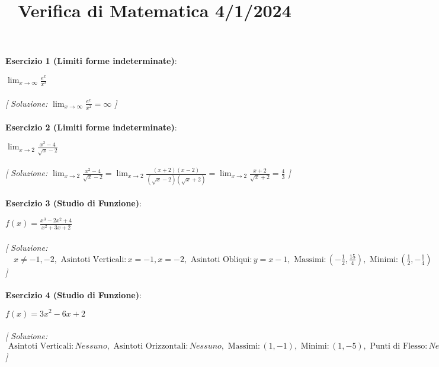 \documentclass{article}
\title{\raggedright Verifica di Matematica  4/1/2024}
\date{}
\begin{document}
\maketitle

\textbf{Esercizio 1 (Limiti forme indeterminate)}:\\
\par $\lim_{{x \to \infty}} \frac{e^x}{x^2}$ \\\\

\textit{[ Soluzione: $\lim_{{x \to \infty}} \frac{e^x}{x^2} = \infty$ ]}\\\\

\textbf{Esercizio 2 (Limiti forme indeterminate)}:\\
\par $\lim_{{x \to 2}} \frac{x^2 - 4}{\sqrt{x} - 2}$ \\\\

\textit{[ Soluzione: $\lim_{{x \to 2}} \frac{x^2 - 4}{\sqrt{x} - 2} = \lim_{{x \to 2}} \frac{(x + 2)(x - 2)}{(\sqrt{x} - 2)(\sqrt{x} + 2)} = \lim_{{x \to 2}} \frac{x + 2}{\sqrt{x} + 2} = \frac{4}{3}$ ]}\\\\

\textbf{Esercizio 3 (Studio di Funzione)}:\\
\par $f(x) = \frac{x^3 - 2x^2 + 4}{x^2 + 3x + 2}$ \\\\

\textit{[ Soluzione: $\quad x \neq -1, -2 , \text{  Asintoti Verticali}: x = -1, x = -2  ,   \text{  Asintoti Obliqui}: y = x - 1 ,  \text{  Massimi}: (-\frac{1}{2}, \frac{15}{4}),   \text{  Minimi}: (\frac{1}{2}, -\frac{1}{4})$ ]}\\\\

\textbf{Esercizio 4 (Studio di Funzione)}:\\
\par $f(x) = 3x^2 - 6x + 2$ \\\\

\textit{[ Soluzione: $\text{  Asintoti Verticali}: Nessuno , \text{  Asintoti Orizzontali}: Nessuno ,  \text{  Massimi}: (1, -1),   \text{  Minimi}: (1, -5),   \text{  Punti di Flesso}: Nessuno$ ]}\\\\
\end{document}
